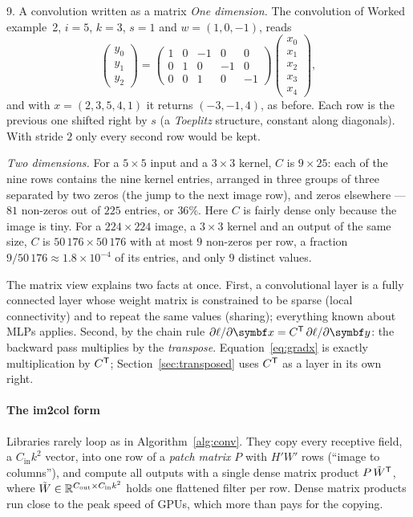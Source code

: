 \documentclass[11pt]{article}
\newcommand{\y}{\vect{y}}
\newcommand{\Cin}{C_{\mathrm{in}}}
\newcommand{\Cout}{C_{\mathrm{out}}}
\newcommand{\Hout}{H'}
\newcommand{\Wout}{W'}
\begin{document}
\begin{worked}{9. A convolution written as a matrix}
\emph{One dimension.} The convolution of Worked example~2, $i = 5$, $k = 3$, $s = 1$ and $w = (1, 0, -1)$, reads
\[
  \begin{pmatrix} y_0 \\ y_1 \\ y_2 \end{pmatrix} =
  \begin{pmatrix} 1 & 0 & -1 & 0 & 0 \\ 0 & 1 & 0 & -1 & 0 \\ 0 & 0 & 1 & 0 & -1 \end{pmatrix}
  \begin{pmatrix} x_0 \\ x_1 \\ x_2 \\ x_3 \\ x_4 \end{pmatrix},
\]
and with $x = (2, 3, 5, 4, 1)$ it returns $(-3, -1, 4)$, as before. Each row is the previous one shifted right by $s$ (a
\emph{Toeplitz} structure, constant along diagonals). With stride $2$ only every second row would be kept.

\emph{Two dimensions.} For a $5 \times 5$ input and a $3 \times 3$ kernel, $C$ is $9 \times 25$: each of the nine rows
contains the nine kernel entries, arranged in three groups of three separated by two zeros (the jump to the next image
row), and zeros elsewhere --- $81$ non-zeros out of $225$ entries, or $36\%$. Here $C$ is fairly dense only because the image is tiny.
For a $224 \times 224$ image, a $3 \times 3$ kernel and an output of the same size, $C$ is $50\,176 \times 50\,176$ with
at most $9$ non-zeros per row, a fraction $9/50\,176 \approx 1.8 \times 10^{-4}$ of its entries, and only $9$
distinct values.
\end{worked}

The matrix view explains two facts at once. First, a convolutional layer is a fully connected layer whose weight matrix
is constrained to be sparse (local connectivity) and to repeat the same values (sharing); everything known about MLPs
applies. Second, by the chain rule $\partial \ell/\partial\x = C\T\,\partial \ell/\partial\y$: the backward pass multiplies by the
\emph{transpose}. Equation~\eqref{eq:gradx} is exactly multiplication by $C^{\mathsf{T}}$; Section~\ref{sec:transposed} uses $C^{\mathsf{T}}$
as a layer in its own right.

\paragraph{The im2col form} Libraries rarely loop as in Algorithm~\ref{alg:conv}. They copy every receptive field, a
$\Cin k^2$ vector, into one row of a \emph{patch matrix} $P$ with $\Hout\Wout$ rows (``image to columns''), and compute
all outputs with a single dense matrix product $P\,\tilde W^{\mathsf{T}}$, where $\tilde W \in \R^{\Cout \times \Cin k^2}$ holds one
flattened filter per row. Dense matrix products run close to the peak speed of GPUs, which more than pays for the
copying.
\end{document}
